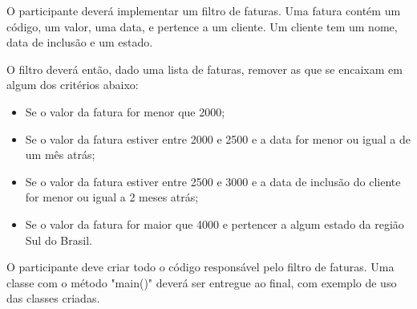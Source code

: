 O participante deverá implementar um filtro de faturas. Uma fatura contém um código, um valor, uma data,
e pertence a um cliente. Um cliente tem um nome, data de inclusão e um estado.

O filtro deverá então, dado uma lista de faturas, remover as que se encaixam em algum dos critérios
abaixo:

\begin{itemize}
	\item Se o valor da fatura for menor que 2000;
	\item Se o valor da fatura estiver entre 2000 e 2500 e a data for menor ou igual a de um mês atrás;
	\item Se o valor da fatura estiver entre 2500 e 3000 e a data de inclusão do cliente for menor ou igual a 2 meses atrás;
	\item Se o valor da fatura for maior que 4000 e pertencer a algum estado da região Sul do Brasil.
\end{itemize}

O participante deve criar todo o código responsável pelo filtro de faturas.
Uma classe com o método "main()" deverá ser entregue ao final, com exemplo 
de uso das classes criadas.